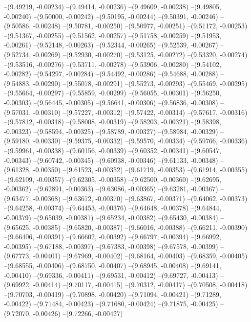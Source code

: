 --(9.49219, -0.00234)
--(9.49414, -0.00236)
--(9.49609, -0.00238)
--(9.49805, -0.00240)
--(9.50000, -0.00242)
--(9.50195, -0.00244)
--(9.50391, -0.00246)
--(9.50586, -0.00248)
--(9.50781, -0.00250)
--(9.50977, -0.00251)
--(9.51172, -0.00253)
--(9.51367, -0.00255)
--(9.51562, -0.00257)
--(9.51758, -0.00259)
--(9.51953, -0.00261)
--(9.52148, -0.00263)
--(9.52344, -0.00265)
--(9.52539, -0.00267)
--(9.52734, -0.00269)
--(9.52930, -0.00270)
--(9.53125, -0.00272)
--(9.53320, -0.00274)
--(9.53516, -0.00276)
--(9.53711, -0.00278)
--(9.53906, -0.00280)
--(9.54102, -0.00282)
--(9.54297, -0.00284)
--(9.54492, -0.00286)
--(9.54688, -0.00288)
--(9.54883, -0.00290)
--(9.55078, -0.00291)
--(9.55273, -0.00293)
--(9.55469, -0.00295)
--(9.55664, -0.00297)
--(9.55859, -0.00299)
--(9.56055, -0.00301)
--(9.56250, -0.00303)
--(9.56445, -0.00305)
--(9.56641, -0.00306)
--(9.56836, -0.00308)
--(9.57031, -0.00310)
--(9.57227, -0.00312)
--(9.57422, -0.00314)
--(9.57617, -0.00316)
--(9.57812, -0.00318)
--(9.58008, -0.00319)
--(9.58203, -0.00321)
--(9.58398, -0.00323)
--(9.58594, -0.00325)
--(9.58789, -0.00327)
--(9.58984, -0.00329)
--(9.59180, -0.00330)
--(9.59375, -0.00332)
--(9.59570, -0.00334)
--(9.59766, -0.00336)
--(9.59961, -0.00338)
--(9.60156, -0.00339)
--(9.60352, -0.00341)
--(9.60547, -0.00343)
--(9.60742, -0.00345)
--(9.60938, -0.00346)
--(9.61133, -0.00348)
--(9.61328, -0.00350)
--(9.61523, -0.00352)
--(9.61719, -0.00353)
--(9.61914, -0.00355)
--(9.62109, -0.00357)
--(9.62305, -0.00358)
--(9.62500, -0.00360)
--(9.62695, -0.00362)
--(9.62891, -0.00363)
--(9.63086, -0.00365)
--(9.63281, -0.00367)
--(9.63477, -0.00368)
--(9.63672, -0.00370)
--(9.63867, -0.00371)
--(9.64062, -0.00373)
--(9.64258, -0.00374)
--(9.64453, -0.00376)
--(9.64648, -0.00378)
--(9.64844, -0.00379)
--(9.65039, -0.00381)
--(9.65234, -0.00382)
--(9.65430, -0.00384)
--(9.65625, -0.00385)
--(9.65820, -0.00387)
--(9.66016, -0.00388)
--(9.66211, -0.00390)
--(9.66406, -0.00391)
--(9.66602, -0.00392)
--(9.66797, -0.00394)
--(9.66992, -0.00395)
--(9.67188, -0.00397)
--(9.67383, -0.00398)
--(9.67578, -0.00399)
--(9.67773, -0.00401)
--(9.67969, -0.00402)
--(9.68164, -0.00403)
--(9.68359, -0.00405)
--(9.68555, -0.00406)
--(9.68750, -0.00407)
--(9.68945, -0.00408)
--(9.69141, -0.00410)
--(9.69336, -0.00411)
--(9.69531, -0.00412)
--(9.69727, -0.00413)
--(9.69922, -0.00414)
--(9.70117, -0.00415)
--(9.70312, -0.00417)
--(9.70508, -0.00418)
--(9.70703, -0.00419)
--(9.70898, -0.00420)
--(9.71094, -0.00421)
--(9.71289, -0.00422)
--(9.71484, -0.00423)
--(9.71680, -0.00424)
--(9.71875, -0.00425)
--(9.72070, -0.00426)
--(9.72266, -0.00427)
